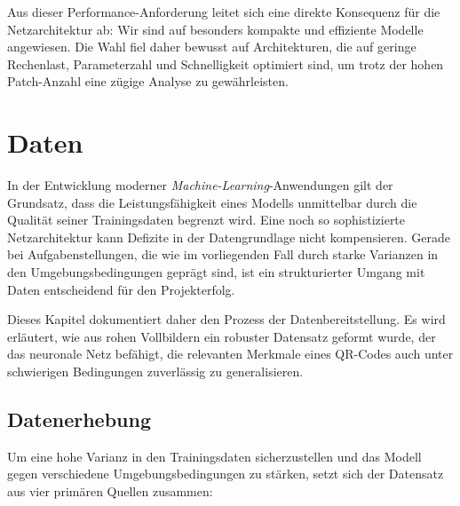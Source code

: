 \documentclass[
    a4paper,        %
    11pt,           %
    ngerman,        %
    parskip=half,   %
    listof=totoc,   %
    bibliography=totoc %
]{scrartcl}
\let\oldsection\section
\renewcommand\section{\clearpage\oldsection}
\begin{document}
Aus dieser Performance-Anforderung leitet sich eine direkte Konsequenz für die Netzarchitektur ab: Wir sind auf besonders kompakte und effiziente Modelle angewiesen. Die Wahl fiel daher bewusst auf Architekturen, die auf geringe Rechenlast, Parameterzahl und Schnelligkeit optimiert sind, um trotz der hohen Patch-Anzahl eine zügige Analyse zu gewährleisten.

\section{Daten} \label{sec:daten}

In der Entwicklung moderner \textit{Machine-Learning}-Anwendungen gilt der Grundsatz, dass die Leistungsfähigkeit eines Modells unmittelbar durch die Qualität seiner Trainingsdaten begrenzt wird. Eine noch so sophistizierte Netzarchitektur kann Defizite in der Datengrundlage nicht kompensieren. Gerade bei Aufgabenstellungen, die wie im vorliegenden Fall durch starke Varianzen in den Umgebungsbedingungen geprägt sind, ist ein strukturierter Umgang mit Daten entscheidend für den Projekterfolg.

Dieses Kapitel dokumentiert daher den Prozess der Datenbereitstellung. Es wird erläutert, wie aus rohen Vollbildern ein robuster Datensatz geformt wurde, der das neuronale Netz befähigt, die relevanten Merkmale eines QR-Codes auch unter schwierigen Bedingungen zuverlässig zu generalisieren.

\subsection{Datenerhebung} \label{subsec:datenerhebung}

Um eine hohe Varianz in den Trainingsdaten sicherzustellen und das Modell gegen verschiedene Umgebungsbedingungen zu stärken, setzt sich der Datensatz aus vier primären Quellen zusammen:
\end{document}
